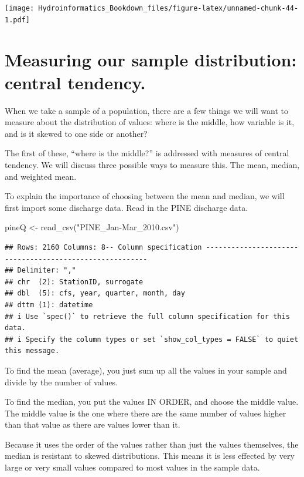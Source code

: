 \documentclass[
]{book}
\newenvironment{Shaded}{\begin{snugshade}}{\end{snugshade}}
\newcommand{\FunctionTok}[1]{\textcolor[rgb]{0.00,0.00,0.00}{#1}}
\newcommand{\NormalTok}[1]{#1}
\newcommand{\OtherTok}[1]{\textcolor[rgb]{0.56,0.35,0.01}{#1}}
\newcommand{\StringTok}[1]{\textcolor[rgb]{0.31,0.60,0.02}{#1}}
\begin{document}
\texttt{[image: Hydroinformatics\_Bookdown\_files/figure-latex/unnamed-chunk-44-1.pdf]}

\hypertarget{measuring-our-sample-distribution-central-tendency.}{%
\section{Measuring our sample distribution: central tendency.}\label{measuring-our-sample-distribution-central-tendency.}}

When we take a sample of a population, there are a few things we will want to measure about the distribution of values: where is the middle, how variable is it, and is it skewed to one side or another?

The first of these, ``where is the middle?'' is addressed with measures of central tendency. We will discuss three possible ways to measure this. The mean, median, and weighted mean.

To explain the importance of choosing between the mean and median, we will first import some discharge data. Read in the PINE discharge data.

\begin{Shaded}
\begin{Highlighting}[]
\NormalTok{pineQ }\OtherTok{\textless{}{-}} \FunctionTok{read\_csv}\NormalTok{(}\StringTok{"PINE\_Jan{-}Mar\_2010.csv"}\NormalTok{)}
\end{Highlighting}
\end{Shaded}

\begin{verbatim}
## Rows: 2160 Columns: 8-- Column specification --------------------------------------------------------
## Delimiter: ","
## chr  (2): StationID, surrogate
## dbl  (5): cfs, year, quarter, month, day
## dttm (1): datetime
## i Use `spec()` to retrieve the full column specification for this data.
## i Specify the column types or set `show_col_types = FALSE` to quiet this message.
\end{verbatim}

To find the mean (average), you just sum up all the values in your sample and divide by the number of values.

To find the median, you put the values IN ORDER, and choose the middle value. The middle value is the one where there are the same number of values higher than that value as there are values lower than it.

Because it uses the order of the values rather than just the values themselves, the median is resistant to skewed distributions. This means it is less effected by very large or very small values compared to most values in the sample data.
\end{document}
